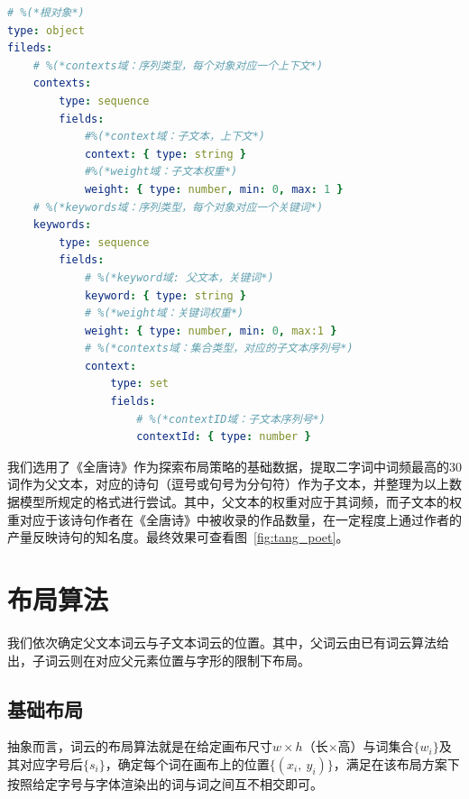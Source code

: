 \begin{lstlisting}[language=yaml, caption=数据模型]
# %(*根对象*)
type: object
fileds:
	# %(*contexts域：序列类型，每个对象对应一个上下文*)
	contexts:
		type: sequence
		fields:
			#%(*context域：子文本，上下文*)
			context: { type: string }
			#%(*weight域：子文本权重*)
			weight: { type: number, min: 0, max: 1 }
	# %(*keywords域：序列类型，每个对象对应一个关键词*)
	keywords:
		type: sequence
		fields:
			# %(*keyword域: 父文本，关键词*)
			keyword: { type: string }
			# %(*weight域：关键词权重*)
			weight: { type: number, min: 0, max:1 }
			# %(*contexts域：集合类型，对应的子文本序列号*)
			context:
				type: set
				fields:
					# %(*contextID域：子文本序列号*)
					contextId: { type: number }
\end{lstlisting}

我们选用了《全唐诗》作为探索布局策略的基础数据，提取二字词中词频最高的$30$词作为父文本，对应的诗句（逗号或句号为分句符）作为子文本，并整理为以上数据模型所规定的格式进行尝试。其中，父文本的权重对应于其词频，而子文本的权重对应于该诗句作者在《全唐诗》中被收录的作品数量，在一定程度上通过作者的产量反映诗句的知名度。最终效果可查看图~\ref{fig:tang_poet}。

\section{布局算法}
\label{sec:layout}
我们依次确定父文本词云与子文本词云的位置。其中，父词云由已有词云算法给出，子词云则在对应父元素位置与字形的限制下布局。
\subsection{基础布局}
抽象而言，词云的布局算法就是在给定画布尺寸$w\times h$（长$\times$高）与词集合$\{w_i\}$及其对应字号后$\{s_i\}$，确定每个词在画布上的位置$\{(x_i,\  y_i)\}$，满足在该布局方案下按照给定字号与字体渲染出的词与词之间互不相交即可。

